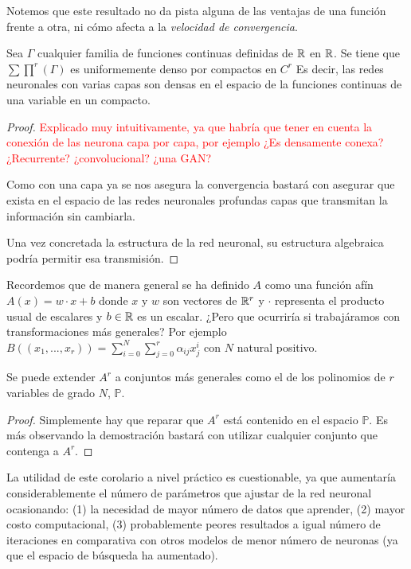 Notemos que este resultado no da pista alguna de las ventajas de una función frente a otra,
 ni cómo afecta a la \textit{velocidad de convergencia}. 

\begin{corolario}

    Sea $\Gamma$ cualquier familia de funciones continuas definidas de $\mathbb{R}$ en $\mathbb{R}$. 
    Se tiene que $\sum \prod ^r (\Gamma)$ es uniformemente denso por compactos en $C^r$  
    Es decir, las redes neuronales con varias capas son densas en el  espacio de la funciones continuas de una variable en un compacto. 
\end{corolario}
\begin{proof}
    \textcolor{red}{Explicado muy intuitivamente, ya que habría que tener en cuenta la conexión de las neurona 
    capa por capa, por ejemplo ¿Es densamente conexa? ¿Recurrente? ¿convolucional? ¿una GAN?}

    Como con una capa ya se nos asegura la convergencia bastará con asegurar que exista 
    en el espacio de las redes neuronales profundas capas que transmitan la información sin cambiarla. 

    Una vez concretada la estructura de la red neuronal,  su estructura algebraica podría permitir esa transmisión. 
\end{proof}

Recordemos que de manera general se ha definido $A$ como una función afín 
$A(x) = w \cdot x + b$ donde $x$ y $w$ son vectores de $\mathbb{R}^r$ y $\cdot$ representa el producto 
usual de escalares y $b \in \mathbb{R}$ es un escalar.  ¿Pero que ocurriría si trabajáramos con transformaciones más generales?  
Por ejemplo $B((x_1, ..., x_r)) = \sum_{i= 0} ^N \sum_{j= 0} ^r \alpha_{ij} x_j^i$  con $N$ natural positivo. 

\begin{corolario}[Generalización de A]  

    Se puede extender $A^r$ a conjuntos más generales como el de los polinomios de $r$ variables de grado $N$, $\mathbb{P}$.  
\end{corolario}
\begin{proof}
    Simplemente hay que reparar que $A^r$ está contenido en el espacio $\mathbb{P}$. 
    Es más observando la demostración bastará con utilizar cualquier conjunto que contenga a $A^r$. 
\end{proof}

La utilidad de este corolario a nivel práctico es cuestionable, ya que aumentaría considerablemente el número de 
parámetros que ajustar de la red neuronal ocasionando: (1) la necesidad de mayor número de datos que aprender, 
(2) mayor costo computacional, (3) probablemente peores resultados a igual número de iteraciones en comparativa 
con otros modelos de menor número de neuronas (ya que el espacio de búsqueda ha aumentado).

